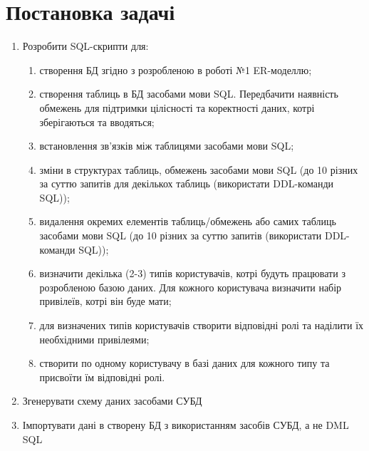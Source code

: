 \section{Постановка задачі}

\begin{enumerate}
	\item Розробити SQL-скрипти для:

	      \begin{enumerate}
		      \item створення БД згідно з розробленою в роботі №1 ER-моделлю;
		      \item створення таблиць в БД засобами мови SQL. Передбачити наявність обмежень для підтримки
		            цілісності та коректності даних, котрі зберігаються та вводяться;
		      \item встановлення зв’язків між таблицями засобами мови SQL;
		      \item зміни в структурах таблиць, обмежень засобами мови SQL (до 10 різних за суттю запитів
		            для декількох таблиць (використати DDL-команди SQL));
		      \item видалення окремих елементів таблиць/обмежень або самих таблиць засобами мови SQL
		            (до 10 різних за суттю запитів (використати DDL-команди SQL));
		      \item визначити декілька (2-3) типів користувачів, котрі будуть працювати з розробленою базою
		            даних. Для кожного користувача визначити набір привілеїв, котрі він буде мати;
		      \item для визначених типів користувачів створити відповідні ролі та наділити їх необхідними привілеями;
		      \item створити по одному користувачу в базі даних для кожного типу та присвоїти їм відповідні ролі.
	      \end{enumerate}

	\item Згенерувати схему даних засобами СУБД
	\item Імпортувати дані в створену БД з використанням засобів СУБД, а не DML SQL
\end{enumerate}
